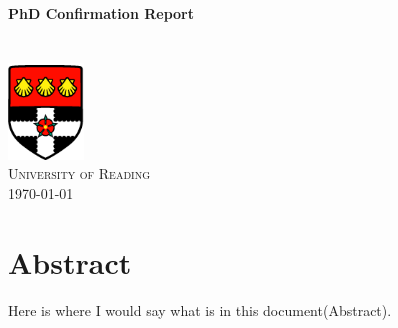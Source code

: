 \documentclass{book}
\begin{document}
\begin{titlepage}
\setcounter{tocdepth}{1}
\textbf{\LARGE PhD Confirmation Report }\\[2.8cm]
\\[1cm]
\\[1cm]
\includegraphics[width=0.15\textwidth]{logo}\\[1.5cm]
\textsc{\large University of Reading }\\[1cm]


{\large \today}\\[2cm]



\vfill %

\end{titlepage}
\chapter*{Abstract}
	Here is where I would say what is in this document(Abstract).

\tableofcontents
\newpage


\end{document}
